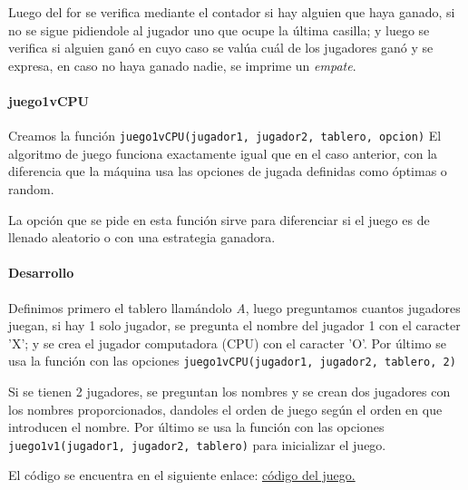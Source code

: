 	Luego del for se verifica mediante el contador si hay alguien que haya ganado, si no se sigue pidiendole al jugador uno que ocupe la última casilla; y luego se verifica si alguien ganó en cuyo caso se valúa cuál de los jugadores ganó y se expresa, en caso no haya ganado nadie, se imprime un \textit{empate}.
	
	\paragraph{juego1vCPU} Creamos la función \texttt{juego1vCPU(jugador1, jugador2, tablero, opcion)} El algoritmo de juego funciona exactamente igual que en el caso anterior, con la diferencia que la máquina usa las opciones de jugada definidas como óptimas o random.
	
	La opción que se pide en esta función sirve para diferenciar si el juego es de llenado aleatorio o con una estrategia ganadora.
	
	\paragraph{Desarrollo}
	
	Definimos primero el tablero llamándolo \textit{A}, luego preguntamos cuantos jugadores juegan, si hay 1 solo jugador, se pregunta el nombre del jugador 1 con el caracter 'X'; y se crea el jugador computadora (CPU) con el caracter 'O'. Por último se usa la función con las opciones \texttt{juego1vCPU(jugador1, jugador2, tablero, 2)}
	
	Si se tienen 2 jugadores, se preguntan los nombres y se crean dos jugadores con los nombres proporcionados, dandoles el orden de juego según el orden en que introducen el nombre. Por último se usa la función con las opciones \texttt{juego1v1(jugador1, jugador2, tablero)} para inicializar el juego.
	
	El código se encuentra en el siguiente enlace: \href{https://github.com/LisandroRomero2023/progra1ecfm/blob/630e5ebf0edde4ac5c7f573e0d6dd16cb3cf615f/Pr%C3%A1ctica2/C%C3%B3digo/totitoPOO.py#L3}{código del juego.}
	
